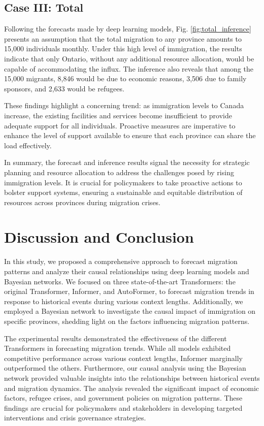 \documentclass[conference]{IEEEtran}
\begin{document}
	\subsection{Case III: Total}
	Following the forecasts made by deep learning models, Fig. \ref{fig:total_inference} presents an assumption that the total migration to any province amounts to 15,000 individuals monthly. Under this high level of immigration, the results indicate that only Ontario, without any additional resource allocation, would be capable of accommodating the influx. The inference also reveals that among the 15,000 migrants, 8,846 would be due to economic reasons, 3,506 due to family sponsors, and 2,633 would be refugees.
	
	These findings highlight a concerning trend: as immigration levels to Canada increase, the existing facilities and services become insufficient to provide adequate support for all individuals. Proactive measures are imperative to enhance the level of support available to ensure that each province can share the load effectively.
	
	In summary, the forecast and inference results signal the necessity for strategic planning and resource allocation to address the challenges posed by rising immigration levels. It is crucial for policymakers to take proactive actions to bolster support systems, ensuring a sustainable and equitable distribution of resources across provinces during migration crises.
	
	\section{Discussion and Conclusion}
	
	In this study, we proposed a comprehensive approach to forecast migration patterns and analyze their causal relationships using deep learning models and Bayesian networks. We focused on three state-of-the-art Transformers: the original Transformer, Informer, and AutoFormer, to forecast migration trends in response to historical events during various context lengths. Additionally, we employed a Bayesian network to investigate the causal impact of immigration on specific provinces, shedding light on the factors influencing migration patterns.
	
	The experimental results demonstrated the effectiveness of the different Transformers in forecasting migration trends. While all models exhibited competitive performance across various context lengths, Informer marginally outperformed the others. Furthermore, our causal analysis using the Bayesian network provided valuable insights into the relationships between historical events and migration dynamics. The analysis revealed the significant impact of economic factors, refugee crises, and government policies on migration patterns. These findings are crucial for policymakers and stakeholders in developing targeted interventions and crisis governance strategies.
	
\end{document}
